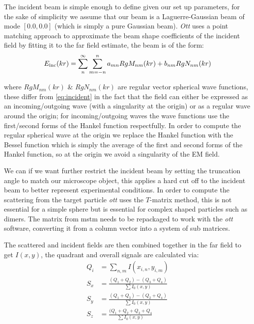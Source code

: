 The incident beam is simple enough to define given our set up parameters, 
for the sake of simplicity we assume that our beam is a Laguerre-Gaussian 
beam of mode $[0.0, 0.0]$ (which is simply a pure Gaussian beam). 
\textit{Ott} uses a point matching approach to approximate the beam shape 
coefficients of the incident field by fitting it to the far field estimate, 
the beam is of the form:
\begin{align}
	E_{\rm inc}(kr)=\sum^\infty_n\sum^n_{m=-n}a_{mn}RgM_{nm}(kr)+b_{nm}RgN_{nm}(kr)
\end{align}

where $RgM_{nm}(kr)$ \& $RgN_{nm}(kr)$ are regular vector spherical wave 
functions, these differ from \eqref{eq:incident} in the fact that the 
field can either be expressed as an incoming/outgoing wave (with a 
singularity at the origin) or as a regular wave around the origin; for 
incoming/outgoing waves the wave functions use the first/second forms of 
the Hankel function respectfully. In order to compute the regular spherical 
wave at the origin we replace the Hankel function with the Bessel function 
which is simply the average of the first and second forms of the Hankel 
function, so at the origin we avoid a singularity of the EM field.  

We can if we want further restrict the incident beam by setting 
the truncation angle to match our microscope object, this applies a 
hard cut off to the incident beam to better represent experimental 
conditions. In order to compute the scattering from 
the target particle \textit{ott} uses the $T$-matrix method, this is not 
essential for a simple sphere but is essential for complex shaped particles 
such as dimers. The matrix from mstm needs to be repackaged to work with the
\textit{ott} software, converting it from a column vector into a system of 
sub matrices. 

The scattered and incident fields are then combined together 
in the far field to get $I(x,y)$, the quadrant and overall signals are 
calculated via:
\begin{align}
	Q_i &= \sum_{n,m} I(x_{i,n}, y_{i,m}) \\
	S_{x} &= \frac{(Q_1+Q_2)-(Q_3+Q_4)}{\sum I_0(x,y)} \\
	S_{y} &= \frac{(Q_1+Q_3)-(Q_2+Q_4)}{\sum I_0(x,y)} \\
	S_{z} &= \frac{(Q_1+Q_2+Q_3+Q_4}{\sum I_0(x,y)}
\end{align}

